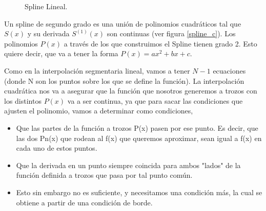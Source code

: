 \begin{figure}[h]
\caption{Spline Lineal.}
\label{spline_l}
\end{figure}




\vspace{0.5cm}

\hspace{0.4cm} Un spline de segundo grado es una uni\'on de polinomios cuadr\'aticos tal que $S(x)$ y su derivada $S^{(1)}(x)$ son continuas (ver figura \ref{spline_c}). Los polinomios $P(x)$ a trav\'es de los que construimos el Spline tienen grado 2. Esto quiere decir, que va a tener la forma $P(x) = ax^2 + bx + c$.

\hspace{0.4cm} Como en la interpolaci\'on segmentaria lineal, vamos a tener $N-1$ ecuaciones (donde N son los puntos sobre los que se define la funci\'on). La interpolaci\'on cuadr\'atica nos va a asegurar que la funci\'on que nosotros generemos a trozos con los distintos $P(x)$ va a ser continua, ya que para sacar las condiciones que ajusten el polinomio, vamos a determinar como condiciones,

\begin{itemize}
  \item Que las partes de la funci\'on a trozos P(x) pasen por ese punto. Es decir, que las dos Pn(x) que rodean al f(x) que queremos aproximar, sean igual a f(x) en cada uno de estos puntos.
  \item Que la derivada en un punto siempre coincida para ambos "lados" de la funci\'on definida a trozos que pasa por tal punto com\'un.
  \item Esto sin embargo no es suficiente, y necesitamos una condici\'on m\'as, la cual se obtiene a partir de una condici\'on de borde.
\end{itemize}




